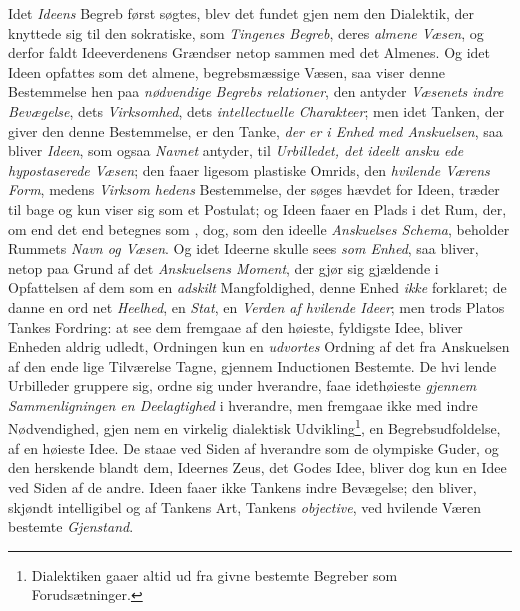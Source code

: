 Idet \emph{Ideens} Begreb først søgtes, blev det fundet gjen\-%
nem den Dialektik, der knyttede sig til den sokratiske, som
\emph{Tingenes Begreb}, deres \emph{almene Væsen}, og derfor faldt
Ideeverdenens Grændser netop sammen med det Almenes. Og
idet Ideen opfattes som det almene, begrebsmæssige Væsen,
saa viser denne Bestemmelse hen paa \emph{nødvendige Begrebs\-%
relationer}, den antyder \emph{Væsenets indre Bevægelse},
dets \emph{Virksomhed}, dets \emph{intellectuelle Charakteer}; men
idet Tanken, der giver den denne Bestemmelse, er den Tanke,
\emph{der er i Enhed med Anskuelsen}, saa bliver \emph{Ideen}, som
ogsaa \emph{Navnet} antyder, til \emph{Urbilledet, det ideelt ansku\-%
ede hypostaserede Væsen}; den faaer ligesom plastiske
Omrids, den \emph{hvilende Værens Form}, medens \emph{Virksom\-%
hedens} Bestemmelse, der søges hævdet for Ideen, træder til\-%
bage og kun viser sig som et Postulat; og Ideen faaer en Plads
i det Rum, der, om end det end betegnes som , dog,
som den ideelle \emph{Anskuelses Schema}, beholder Rummets
\emph{Navn og Væsen}. Og idet Ideerne skulle sees \emph{som Enhed},
saa bliver, netop paa Grund af det \emph{Anskuelsens Moment},
der gjør sig gjældende i Opfattelsen af dem som en \emph{adskilt}
Mangfoldighed, denne Enhed \emph{ikke} forklaret; de danne en ord\-%
net \emph{Heelhed}, en \emph{Stat}, en \emph{Verden af hvilende Ideer}; men
trods Platos Tankes Fordring: at see dem fremgaae af den
høieste, fyldigste Idee, bliver Enheden aldrig udledt, Ordningen
kun en \emph{udvortes} Ordning af det fra Anskuelsen af den ende\-%
lige Tilværelse Tagne, gjennem Inductionen Bestemte. De hvi\-%
lende Urbilleder gruppere sig, ordne sig under hverandre, faae
idethøieste \emph{gjennem Sammenligningen en Deelagtighed} i
hverandre, men fremgaae ikke med indre Nødvendighed, gjen\-%
nem en virkelig dialektisk Udvikling\footnote{Dialektiken gaaer altid ud
fra givne bestemte Begreber som Forudsætninger.}, en Begrebsudfoldelse,
 af en høieste Idee. De staae ved Siden af hverandre som de
olympiske Guder, og den herskende blandt dem, Ideernes Zeus,
det Godes Idee, bliver dog kun en Idee ved Siden af de
andre. Ideen faaer ikke Tankens indre Bevægelse; den bliver,
skjøndt intelligibel og af Tankens Art, Tankens \emph{objective},
ved hvilende Væren bestemte \emph{Gjenstand}.

